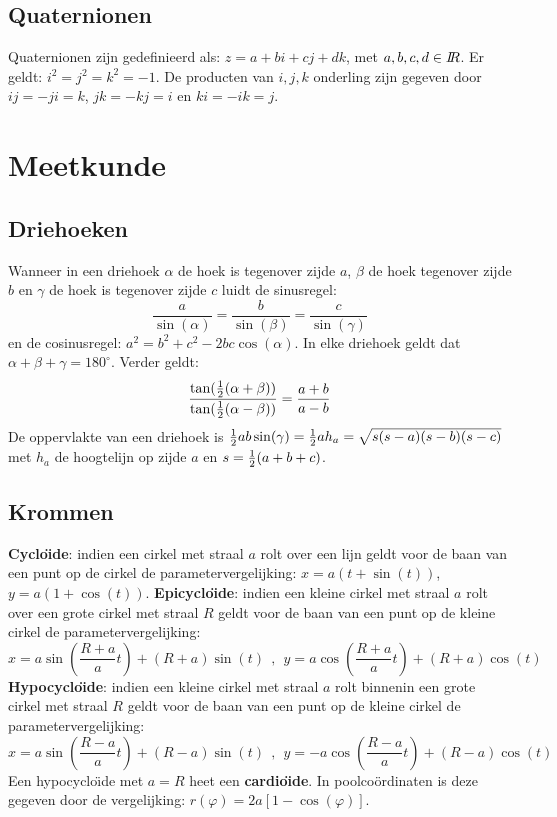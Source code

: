\documentclass[twoside]{report}
\begin{document}
\subsection{Quaternionen}
Quaternionen zijn gedefinieerd als: $z=a+bi+cj+dk$, met $a,b,c,d\in I\hspace{-1mm}R$.
Er geldt: $i^2=j^2=k^2=-1$. De producten van $i,j,k$ onderling zijn gegeven
door $ij=-ji=k$, $jk=-kj=i$ en $ki=-ik=j$.

\section{Meetkunde}
\subsection{Driehoeken}
Wanneer in een driehoek $\alpha$ de hoek is tegenover zijde $a$, $\beta$ de
hoek tegenover zijde $b$ en $\gamma$ de hoek is tegenover zijde $c$ luidt de
sinusregel:
\[
\frac{a}{\sin(\alpha)}=\frac{b}{\sin(\beta)}=\frac{c}{\sin(\gamma)}
\]
en de cosinusregel: $a^2=b^2+c^2-2bc\cos(\alpha)$. In elke driehoek geldt dat
$\alpha+\beta+\gamma=180^\circ$.
\npar
Verder geldt:
\[
\frac{\tan(\mbox{$\frac{1}{2}$}(\alpha+\beta))}{\tan(\mbox{$\frac{1}{2}$}(\alpha-\beta))}=\frac{a+b}{a-b}
\]
De oppervlakte van een driehoek is
$\mbox{$\frac{1}{2}$} ab\sin(\gamma)=\mbox{$\frac{1}{2}$} ah_a=\sqrt{s(s-a)(s-b)(s-c)}$ met $h_a$ de
hoogtelijn op zijde $a$ en $s=\mbox{$\frac{1}{2}$}(a+b+c)$.

\subsection{Krommen}
{\bf Cyclo\"{\i}de}: indien een cirkel met straal $a$ rolt over een
lijn geldt voor de baan van een punt op de cirkel de parametervergelijking:
$x=a(t+\sin(t))$, $y=a(1+\cos(t))$.
\npar
{\bf Epicyclo\"{\i}de}: indien een kleine cirkel met straal $a$ rolt over een
grote cirkel met straal $R$ geldt voor de baan van een punt op de kleine
cirkel de parametervergelijking:
\[
x=a\sin\left(\frac{R+a}{a}t\right)+(R+a)\sin(t)~~,~~
y=a\cos\left(\frac{R+a}{a}t\right)+(R+a)\cos(t)
\]
{\bf Hypocyclo\"{\i}de}: indien een kleine cirkel met straal $a$ rolt
binnenin een grote cirkel met straal $R$ geldt voor de baan van een punt op
de kleine cirkel de parametervergelijking:
\[
x=a\sin\left(\frac{R-a}{a}t\right)+(R-a)\sin(t)~~,~~
y=-a\cos\left(\frac{R-a}{a}t\right)+(R-a)\cos(t)
\]
Een hypocyclo\"{\i}de met $a=R$ heet een {\bf cardio\"{\i}de}. In
poolco\"ordinaten is deze gegeven door de vergelijking:
$r(\varphi)=2a[1-\cos(\varphi)]$.
\end{document}
